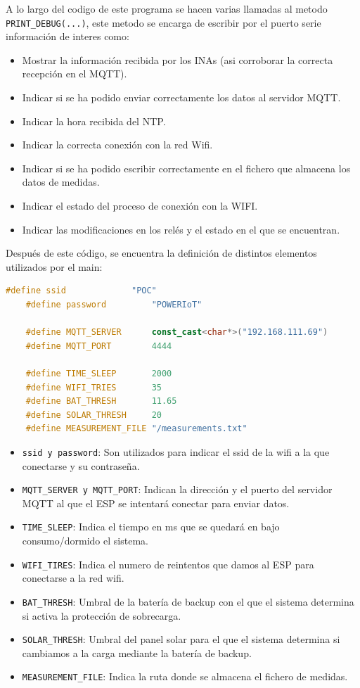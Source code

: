 A lo largo del codigo de este programa se hacen varias llamadas al metodo \texttt{PRINT_DEBUG(...)}, este metodo se encarga de escribir por el puerto serie información de interes como:
\begin{itemize}
    \item Mostrar la información recibida por los INAs (asi corroborar la correcta recepción en el MQTT).
    \item Indicar si se ha podido enviar correctamente los datos al servidor MQTT.
    \item Indicar la hora recibida del NTP.
    \item Indicar la correcta conexión con la red Wifi.
    \item Indicar si se ha podido escribir correctamente en el fichero que almacena los datos de medidas.
    \item Indicar el estado del proceso de conexión con la WIFI.
    \item Indicar las modificaciones en los relés y el estado en el que se encuentran.
\end{itemize}

Después de este código, se encuentra la definición de distintos elementos utilizados por el main:
\begin{lstlisting}[captionpos=b, caption={DEFINES de MAIN_POWER}, language=c++]
    #define ssid             "POC"
    #define password         "POWERIoT"
    
    #define MQTT_SERVER      const_cast<char*>("192.168.111.69")
    #define MQTT_PORT        4444
    
    #define TIME_SLEEP       2000
    #define WIFI_TRIES       35
    #define BAT_THRESH       11.65
    #define SOLAR_THRESH     20
    #define MEASUREMENT_FILE "/measurements.txt"
\end{lstlisting}

\begin{itemize}
    \item \texttt{ssid y password}: Son utilizados para indicar el ssid de la wifi a la que conectarse y su contraseña. 
    \item \texttt{MQTT_SERVER y MQTT_PORT}: Indican la dirección y el puerto del servidor MQTT al que el ESP se intentará conectar para enviar datos.
    \item \texttt{TIME_SLEEP}: Indica el tiempo en ms que se quedará en bajo consumo/dormido el sistema.
    \item \texttt{WIFI_TIRES}: Indica el numero de reintentos que damos al ESP para conectarse a la red wifi.
    \item \texttt{BAT_THRESH}: Umbral de la batería de backup con el que el sistema determina si activa la protección de sobrecarga.
    \item \texttt{SOLAR_THRESH}: Umbral del panel solar para el que el sistema determina si cambiamos a la carga mediante la batería de backup.
    \item \texttt{MEASUREMENT\_FILE}: Indica la ruta donde se almacena el fichero de medidas.
\end{itemize}

